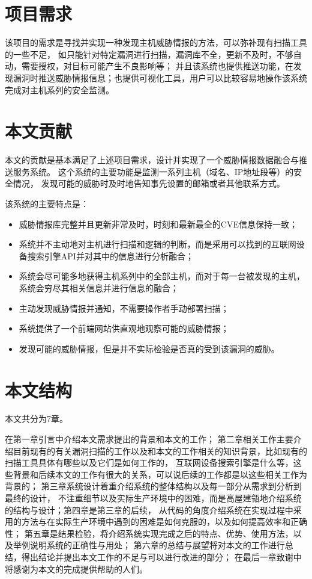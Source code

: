 \section{项目需求}
\label{sec:requirements}

该项目的需求是寻找并实现一种发现主机威胁情报的方法，可以弥补现有扫描工具的一些不足，
如只能针对特定漏洞进行扫描，漏洞库不全，更新不及时，不够自动，需要授权，对目标可能产生不良影响等；
并且该系统也提供推送功能，在发现漏洞时推送威胁情报信息；也提供可视化工具，用户可以比较容易地操作该系统完成对主机系列的安全监测。

\section{本文贡献}
\label{sec:contributions} 

本文的贡献是基本满足了上述项目需求，设计并实现了一个威胁情报数据融合与推送服务系统。
这个系统的主要功能是监测一系列主机（域名、IP地址段等）的安全情况，
发现可能的威胁时及时地告知事先设置的邮箱或者其他联系方式。

该系统的主要特点是：
\begin{itemize}
  \item 威胁情报库完整并且更新非常及时，时刻和最新最全的CVE信息保持一致；
  \item 系统并不主动地对主机进行扫描和逻辑的判断，而是采用可以找到的互联网设备搜索引擎API并对其中的信息进行分析融合；
  \item 系统会尽可能多地获得主机系列中的全部主机，而对于每一台被发现的主机，系统会穷尽其相关信息并进行信息的融合；
  \item 主动发现威胁情报并通知，不需要操作者手动部署扫描；
  \item 系统提供了一个前端网站供直观地观察可能的威胁情报；
  \item 发现可能的威胁情报，但是并不实际检验是否真的受到该漏洞的威胁。
\end{itemize}

\section{本文结构}
\label{sec:structure}

本文共分为7章。

在第一章引言中介绍本文需求提出的背景和本文的工作；
第二章相关工作主要介绍目前现有的有关漏洞扫描的工作以及和本文的工作相关的知识背景，比如现有的扫描工具具体有哪些以及它们是如何工作的，
互联网设备搜索引擎是什么等，这些背景和后续本文的工作有很大的关系，可以说后续的工作都是以这些相关工作为背景的；
第三章系统设计着重介绍系统的整体结构以及每一部分从需求到分析到最终的设计，
不注重细节以及实际生产环境中的困难，而是高屋建瓴地介绍系统的结构与设计；第四章是第三章的后续，
从代码的角度介绍系统在实现过程中采用的方法与在实际生产环境中遇到的困难是如何克服的，以及如何提高效率和正确性；
第五章是结果检验，将介绍系统实现完成之后的特点、优势、使用方法，以及举例说明系统的正确性与用处；
第六章的总结与展望将对本文的工作进行总结，得出结论并提出本文工作的不足与可以进行改进的部分；
在最后一章致谢中将感谢为本文的完成提供帮助的人们。
